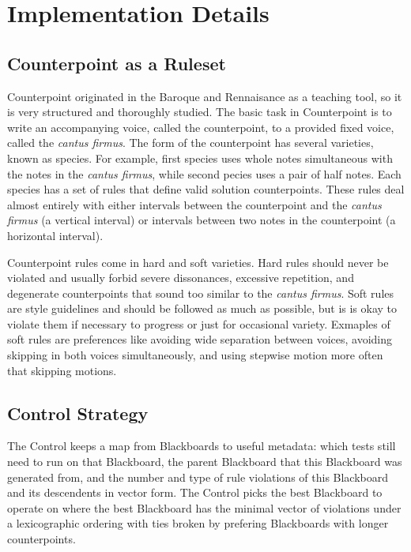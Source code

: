 \section{Implementation Details}

\subsection{Counterpoint as a Ruleset}
Counterpoint originated in the Baroque and Rennaisance as a teaching tool, so it is very structured and thoroughly studied.
The basic task in Counterpoint is to write an accompanying voice, called the counterpoint, to a provided fixed voice, called the \emph{cantus firmus}.
The form of the counterpoint has several varieties, known as species. 
For example, first species uses whole notes simultaneous with the notes in the \emph{cantus firmus}, while second pecies uses a pair of half notes.
Each species has a set of rules that define valid solution counterpoints.
These rules deal almost entirely with either intervals between the counterpoint and the \emph{cantus firmus} (a vertical interval) or intervals between two notes in the counterpoint (a horizontal interval).

Counterpoint rules come in hard and soft varieties. 
Hard rules should never be violated and usually forbid severe dissonances, excessive repetition, and degenerate counterpoints that sound too similar to the \emph{cantus firmus}.
Soft rules are style guidelines and should be followed as much as possible, but is is okay to violate them if necessary to progress or just for occasional variety.
Exmaples of soft rules are preferences like avoiding wide separation between voices, avoiding skipping in both voices simultaneously, and using stepwise motion more often that skipping motions.

\subsection{Control Strategy}
The Control keeps a map from Blackboards to useful metadata: 
  which tests still need to run on that Blackboard,
  the parent Blackboard that this Blackboard was generated from,
  and the number and type of rule violations of this Blackboard and its descendents in vector form.
The Control picks the best Blackboard to operate on 
  where the best Blackboard has the minimal vector of violations under a lexicographic ordering 
  with ties broken by prefering Blackboards with longer counterpoints.

